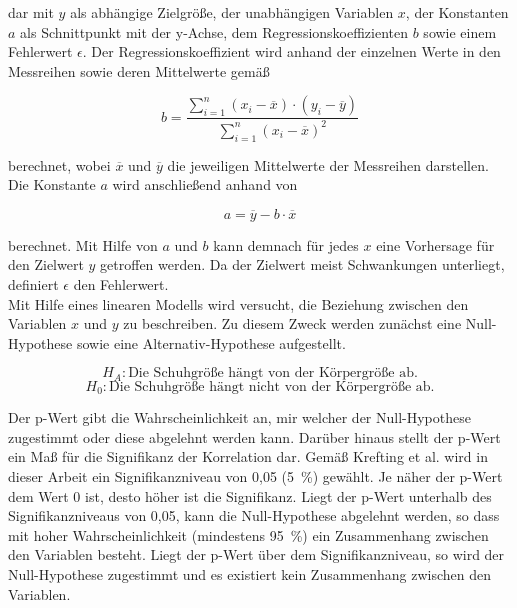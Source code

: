 dar mit $y$ als abhängige Zielgröße, der unabhängigen Variablen $x$, der Konstanten $a$ als Schnittpunkt mit der y-Achse, dem Regressionskoeffizienten $b$ sowie einem Fehlerwert $\epsilon$. Der Regressionskoeffizient wird anhand der einzelnen Werte in den Messreihen sowie deren Mittelwerte gemäß

\begin{equation}
b = \frac{\sum \limits_{i=1}^n(x_i-\overline{x}) \cdot (y_i-\overline{y})}{\sum \limits_{i=1}^n(x_i-\overline{x})^2} 
	\label{eq:regcoef}
\end{equation}

berechnet, wobei $\overline{x}$ und $\overline{y}$ die jeweiligen Mittelwerte der Messreihen darstellen. Die Konstante $a$ wird anschließend anhand von 

\begin{equation}
a = \overline{y} - b \cdot \overline{x}
	\label{eq:konstante}
\end{equation}

berechnet. Mit Hilfe von $a$ und $b$ kann demnach für jedes $x$ eine Vorhersage für den Zielwert $y$ getroffen werden. Da der Zielwert meist Schwankungen unterliegt, definiert $\epsilon$ den Fehlerwert. \parencite{frank_einfach_2006}\\

Mit Hilfe eines linearen Modells wird versucht, die Beziehung zwischen den Variablen $x$ und $y$ zu beschreiben. Zu diesem Zweck werden zunächst eine Null-Hypothese sowie eine Alternativ-Hypothese aufgestellt.

\begin{equation}
H_A: \text{Die Schuhgröße hängt von der Körpergröße ab}. \nonumber
\end{equation}
\begin{equation}
H_0: \text{Die Schuhgröße hängt nicht von der Körpergröße ab}.
	\label{eq:null-hypo}
\end{equation}

Der p-Wert gibt die Wahrscheinlichkeit an, mir welcher der Null-Hypothese zugestimmt oder diese abgelehnt werden kann. Darüber hinaus stellt der p-Wert ein Maß für die Signifikanz der Korrelation dar. Gemäß Krefting et al. wird in dieser Arbeit ein Signifikanzniveau von 0,05 (5~\%) gewählt. Je näher der p-Wert dem Wert 0 ist, desto höher ist die Signifikanz. Liegt der p-Wert unterhalb des Signifikanzniveaus von 0,05, kann die Null-Hypothese abgelehnt werden, so dass mit hoher Wahrscheinlichkeit (mindestens 95~\%) ein Zusammenhang zwischen den Variablen besteht. Liegt der p-Wert über dem Signifikanzniveau, so wird der Null-Hypothese zugestimmt und es existiert kein Zusammenhang zwischen den Variablen. \parencite{frank_einfach_2006}

